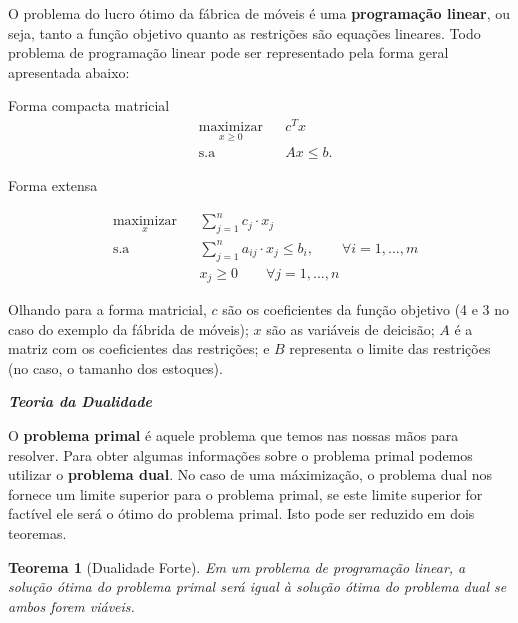 O problema do lucro ótimo da fábrica de móveis é uma \textbf{programação linear}, ou seja, tanto a função objetivo quanto as restrições são equações lineares. Todo problema de programação linear pode ser representado pela forma geral apresentada abaixo:

Forma compacta matricial
\begin{equation*}
\begin{aligned}
& \underset{x\geq0}{\text{maximizar}}
& & c^{T}x \\
& \text{s.a}
& & Ax \leq b.
\end{aligned}
\end{equation*}

Forma extensa

\begin{equation*}
\begin{aligned}
& \underset{x}{\text{maximizar}}
& & \sum_{j=1}^{n}c_{j}\cdot x_{j} \\
& \text{s.a}
& &\sum_{j=1}^{n}a_{ij}\cdot x_{j}\leq b_{i},\qquad\forall i=1,...,m\\
& & & x_j \geq0\qquad\forall j=1,...,n
\end{aligned}
\end{equation*}

Olhando para a forma matricial, $c$ são os coeficientes da função objetivo (4 e 3 no caso do exemplo da fábrida de móveis); $x$ são as variáveis de deicisão; $A$ é a matriz com os coeficientes das restrições; e $B$ representa o limite das restrições (no caso, o tamanho dos estoques). 

\textbf{\textit{Teoria da Dualidade}}


O \textbf{problema primal} é aquele problema que temos nas nossas mãos para resolver. Para obter algumas informações sobre o problema primal podemos utilizar o \textbf{problema dual}. No caso de uma máximização, o problema dual nos fornece um limite superior para o problema primal, se este limite superior for factível ele será o ótimo do problema primal. Isto pode ser reduzido em dois teoremas. 

\newtheorem{teo}{Teorema}[section]
\begin{teo}[Dualidade Forte]
Em um problema de programação linear, a solução ótima do problema primal será igual à solução ótima do problema dual se ambos forem viáveis. 
\end{teo}

